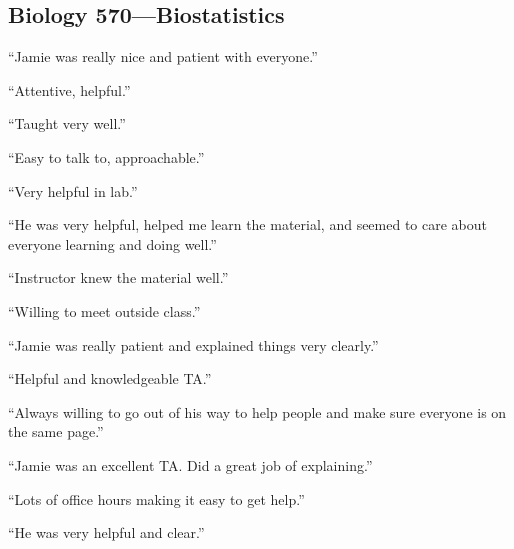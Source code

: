 \begin{multicols}{2}
\subsection*{Biology 570---Biostatistics}
\begin{myItemize}
\sffamily
\item ``Jamie was really nice and patient with everyone.''
\item ``Attentive, helpful.''
\item ``Taught very well.''
\item ``Easy to talk to, approachable.''
\item ``Very helpful in lab.''
\item ``He was very helpful, helped me learn the material, and seemed to care
about everyone learning and doing well.''
\item ``Instructor knew the material well.''
\item ``Willing to meet outside class.''
\item ``Jamie was really patient and explained things very clearly.''
\item ``Helpful and knowledgeable TA.''
\item ``Always willing to go out of his way to help people and make sure
everyone is on the same page.''
\item ``Jamie was an excellent TA. Did a great job of explaining.''
\item ``Lots of office hours making it easy to get help.''
\item ``He was very helpful and clear.''
\end{myItemize}
\end{multicols}

